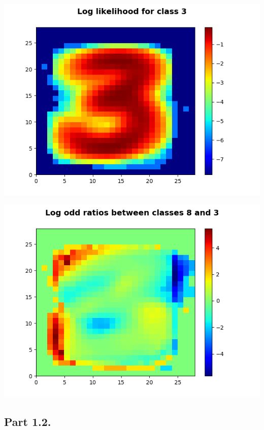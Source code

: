 \documentclass[11pt]{article}
\begin{document}
\begin{center}
\includegraphics[scale=0.75]{part1/1/log_likelihood_3.png}
\end{center}

\begin{center}
\includegraphics[scale=1]{part1/1/odd_ratio_8_3.png}
\end{center}

\pagebreak
\subsection*{Part 1.2.}
\end{document}

